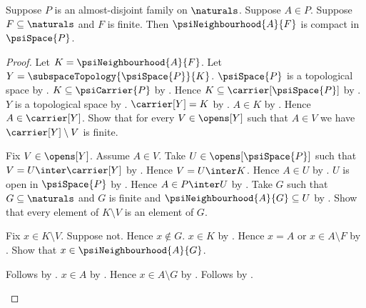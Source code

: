 \begin{theorem}\label{psi_neighbourhood_compact}
    Suppose $P$ is an almost-disjoint family on $\naturals$.
    Suppose $A\in P$.
    Suppose $F\subseteq\naturals$ and $F$ is finite.
    Then $\psiNeighbourhood{A}{F}$ is compact in $\psiSpace{P}$.
\end{theorem}
\begin{proof}
    Let $K=\psiNeighbourhood{A}{F}$.
    Let $Y=\subspaceTopology{\psiSpace{P}}{K}$.
    $\psiSpace{P}$ is a topological space
        by .
    $K\subseteq\psiCarrier{P}$
        by .
    Hence $K\subseteq\carrier[\psiSpace{P}]$ by .
    $Y$ is a topological space
        by .
    $\carrier[Y]=K$ by .
    $A\in K$ by .
    Hence $A\in\carrier[Y]$.
    Show that for every $V\in\opens[Y]$ such that $A\in V$ we have
        $\carrier[Y]\setminus V$ is finite.
    \begin{subproof}
        Fix $V\in\opens[Y]$.
        Assume $A\in V$.
        Take $U\in\opens[\psiSpace{P}]$ such that
            $V=U\inter\carrier[Y]$ by .
        Hence $V=U\inter K$.
        Hence $A\in U$ by .
        $U$ is open in $\psiSpace{P}$ by .
        Hence $A\in P\inter U$ by .
        Take $G$ such that $G\subseteq\naturals$ and $G$ is finite and
            $\psiNeighbourhood{A}{G}\subseteq U$
            by .
        Show that every element of $K\setminus V$ is an element of $G$.
        \begin{subproof}
            Fix $x\in K\setminus V$.
            Suppose not.
            Hence $x\notin G$.
            $x\in K$ by .
            Hence $x=A$ or $x\in A\setminus F$
                by .
            Show that $x\in\psiNeighbourhood{A}{G}$.
            \begin{subproof}
                \begin{byCase}
                        Follows by
                            .
                        $x\in A$ by .
                        Hence $x\in A\setminus G$ by .
                        Follows by
                            .

\end{byCase}
\end{subproof}
\end{subproof}
\end{subproof}
\end{proof}
